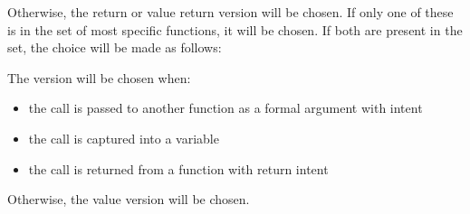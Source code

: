 Otherwise, the  return or value return version will be
chosen. If only one of these is in the set of most specific functions, it
will be chosen. If both are present in the set, the choice will be made
as follows:

The  version will be chosen when:

\begin{itemize}

\item the call is passed to another function as a formal argument with
 intent

\item the call is captured into a  variable

\item the call is returned from a function with  return intent

\end{itemize}

Otherwise, the value version will be chosen.
